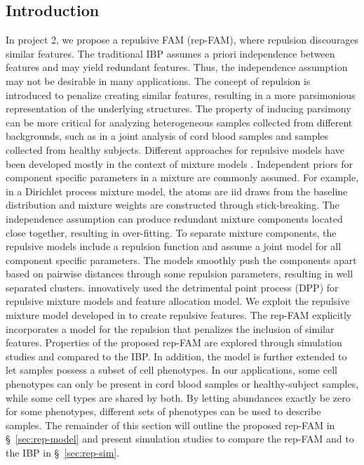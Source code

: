 \documentclass[12pt,]{article}
\begin{document}
\subsection{Introduction}
In project 2, we propose a repulsive FAM (rep-FAM), where repulsion discourages
similar features. The traditional IBP assumes a priori independence between
features and may yield redundant features. Thus, the independence assumption
may not be desirable in many applications.  The concept of repulsion is
introduced to penalize creating similar features, resulting in a more
parsimonious representation of the underlying structures.  The property of
inducing parsimony can be more critical for analyzing heterogeneous samples
collected from different backgrounds, such as in a joint analysis of cord blood
samples and samples collected from healthy subjects.  Different approaches for
repulsive models have been developed mostly in the context of mixture models
\citep{petralia2012repulsive, quinlan2017parsimonious, xie2017bayesian,
quinlan2017density}.  Independent priors for component specific parameters in a
mixture are commonly assumed. For example, in a Dirichlet process mixture model,
the atoms are iid draws from the baseline distribution and mixture weights are
constructed through stick-breaking. The independence assumption can produce
redundant mixture components located close together, resulting in over-fitting.
To separate mixture components, the repulsive models include a repulsion
function and assume a joint model for all component specific parameters.  The
models smoothly push the components apart based on pairwise distances through
some repulsion parameters, resulting in well separated clusters.
\cite{xu2016bayesian} innovatively used the detrimental point process (DPP) for
repulsive mixture models and feature allocation model.  We exploit the
repulsive mixture model developed in \cite{quinlan2017density} to create
repulsive features.  The rep-FAM explicitly incorporates a model for the
repulsion that penalizes the inclusion of similar features. Properties of the
proposed rep-FAM are explored through simulation studies and compared to the
IBP. In addition, the model is further extended to let samples possess a
subset of cell phenotypes. In our applications, some cell phenotypes can only
be present in cord blood samples or healthy-subject samples, while some cell
types are shared by both.  By letting abundances exactly be zero for some
phenotypes, different sets of phenotypes can be used to describe samples.  The
remainder of this section will outline the proposed rep-FAM in
\S~\ref{sec:rep-model} and present simulation studies to compare the rep-FAM
and to the IBP in \S~\ref{sec:rep-sim}.
\end{document}
